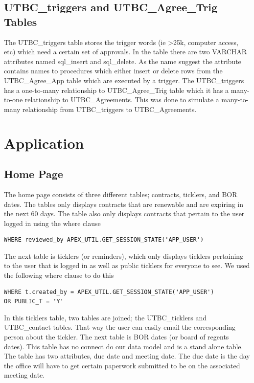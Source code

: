 \documentclass{report}
\begin{document}
\section{UTBC\_triggers and UTBC\_Agree\_Trig Tables}
The UTBC\_triggers table stores the trigger words (ie >25k, computer access, etc) which need a certain set of approvals. In the table there are two VARCHAR attributes named sql\_insert and sql\_delete. As the name suggest the attribute contains names to procedures which either insert or delete rows from the UTBC\_Agree\_App table which are executed by a trigger. The UTBC\_triggers has a one-to-many relationship to UTBC\_Agree\_Trig table which it has a many-to-one relationship to UTBC\_Agreements. This was done to simulate a many-to-many relationship from UTBC\_triggers to UTBC\_Agreements. 

\chapter{Application}

\section{Home Page}
The home page consists of three different tables; contracts, ticklers, and BOR dates. The tables only displays contracts that are renewable and are expiring in the next 60 days. The table also only displays contracts that pertain to the user logged in using the where clause

\begin{lstlisting}[caption=Contracts table where clause for user]
WHERE reviewed_by APEX_UTIL.GET_SESSION_STATE('APP_USER')
\end{lstlisting}

The next table is ticklers (or reminders), which only displays ticklers pertaining to the user that is logged in as well as public ticklers for everyone to see. We used the following where clause to do this

\begin{lstlisting}[caption=Tickler table where clause]
WHERE t.created_by = APEX_UTIL.GET_SESSION_STATE('APP_USER')
OR PUBLIC_T = 'Y'
\end{lstlisting}

In this ticklers table, two tables are joined; the UTBC\_ticklers and UTBC\_contact tables. That way the user can easily email the corresponding person about the tickler. 
The next table is BOR dates (or board of regents dates). This table has no connect do our data model and is a stand alone table. The table has two attributes, due date and meeting date. The due date is the day the office will have to get certain paperwork submitted to be on the associated meeting date.
\end{document}
